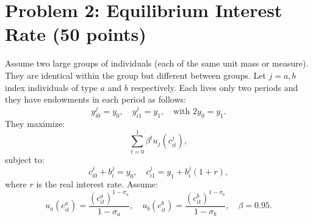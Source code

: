 \documentclass[12pt]{article}
\begin{document}
\section*{Problem 2: Equilibrium Interest Rate (50 points)}

Assume two large groups of individuals (each of the same unit mass or measure). They are identical within the group but different between groups. Let \(j = a, b\) index individuals of type \(a\) and \(b\) respectively. Each lives only two periods and they have endowments in each period as follows:
\[
y_{i0}^j = y_0, \quad y_{i1}^j = y_1, \quad \text{with } 2y_0 = y_1.
\]
They maximize:
\[
\sum_{t=0}^{1} \beta^t u_j(c_{it}^j),
\]
subject to:
\[
c_{i0}^j + b_i^j = y_0, \quad c_{i1}^j = y_1 + b_i^j(1 + r),
\]
where \(r\) is the real interest rate. Assume:
\[
u_a(c_{it}^a) = \frac{(c_{it}^a)^{1-\sigma_a}}{1-\sigma_a}, \quad u_b(c_{it}^b) = \frac{(c_{it}^b)^{1-\sigma_b}}{1-\sigma_b}, \quad \beta = 0.95.
\]
\end{document}
